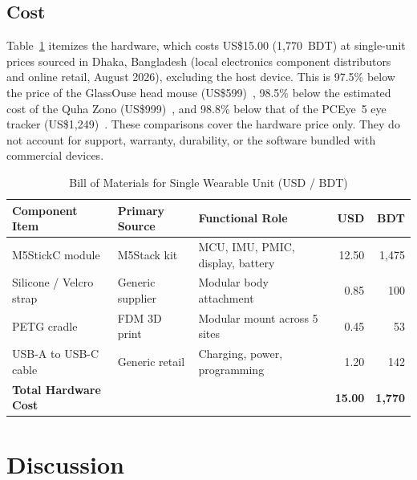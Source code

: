 \documentclass[journal]{IEEEtran}
\begin{document}
\subsection{Cost}
Table~\ref{tab:bom} itemizes the hardware, which costs US\$15.00 (1,770~BDT) at single-unit prices sourced in Dhaka, Bangladesh (local electronics component distributors and online retail, August 2026), excluding the host device. This is 97.5\% below the price of the GlassOuse head mouse (US\$599)~\cite{glassouse}, 98.5\% below the estimated cost of the Quha Zono (US\$999)~\cite{montechquha}, and 98.8\% below that of the PCEye~5 eye tracker (US\$1,249)~\cite{montechpceye}. These comparisons cover the hardware price only. They do not account for support, warranty, durability, or the software bundled with commercial devices.

\begin{table}[!t]
\caption{Bill of Materials for Single Wearable Unit (USD / BDT)}
\label{tab:bom}
\centering
\footnotesize
\setlength{\tabcolsep}{3.5pt}
\begin{tabular}{@{}>{\raggedright\arraybackslash}p{2.1cm}>{\raggedright\arraybackslash}p{1.7cm}>{\raggedright\arraybackslash}p{2.35cm}rr@{}}
\toprule
Component Item & Primary Source & Functional Role & USD & BDT \\
\midrule
M5StickC module & M5Stack kit & MCU, IMU, PMIC, display, battery & 12.50 & 1,475 \\
Silicone / Velcro strap & Generic supplier & Modular body attachment & 0.85 & 100 \\
PETG cradle & FDM 3D print & Modular mount across 5 sites & 0.45 & 53 \\
USB-A to USB-C cable & Generic retail & Charging, power, programming & 1.20 & 142 \\
\midrule
\textbf{Total Hardware Cost} & & & \textbf{15.00} & \textbf{1,770} \\
\bottomrule
\end{tabular}
\end{table}

\section{Discussion}
\label{sec:discussion}
\end{document}
